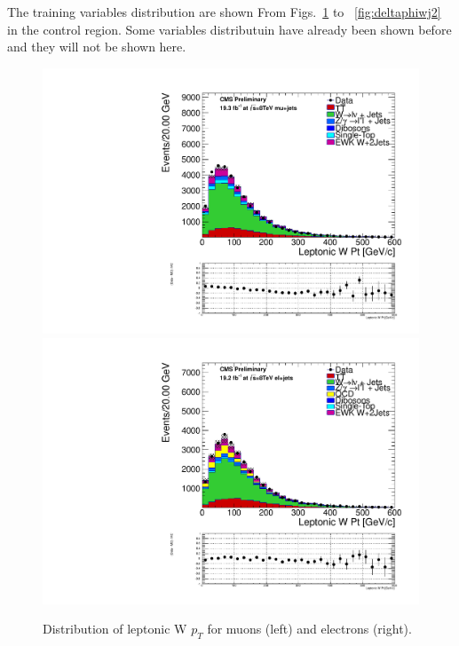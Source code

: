 The training variables distribution are shown From Figs.~\ref{fig:lepw_pt} to ~\ref{fig:deltaphiwj2} in the control region. Some variables distributuin have already been shown before and they will not be shown here. 


\begin{figure}[ht]
\centerline{
   \includegraphics[width=.45\textwidth]{figs/n-1_plots_mu/mu_EWK_W_2jets_W_pt_mjj_600_tagjet1_60_tagjet2_50_Zeppenfield_1point2_EWKW2jets.pdf}
   \includegraphics[width=.45\textwidth]{figs/n-1_plots_el/el_EWK_W_2jets_W_pt_mjj_600_tagjet1_60_tagjet2_50_Zeppenfield_1point2_met_30_WmT_30_EWKW2jets.pdf}
}
\caption{Distribution of leptonic W $p_{T}$ for muons (left) and electrons (right).}
\label{fig:lepw_pt}
\end{figure}

